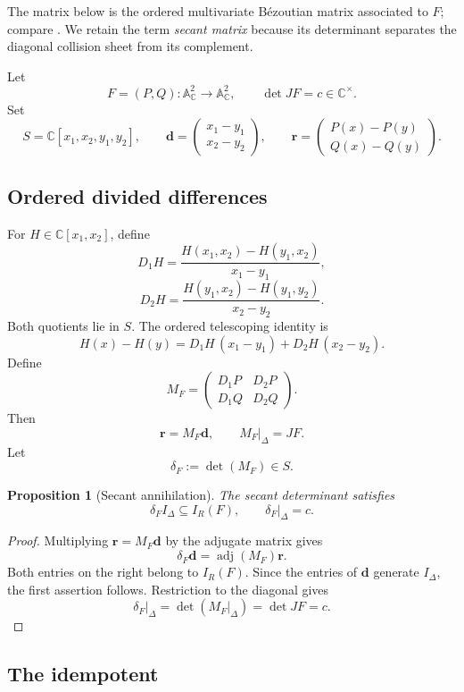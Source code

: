 \documentclass[11pt]{article}
\newtheorem{proposition}[theorem]{Proposition}
\newcommand{\A}{\mathbb A}
\newcommand{\C}{\mathbb C}
\begin{document}
The matrix below is the ordered multivariate B\'ezoutian matrix associated
to \(F\); compare \cite{McKean2023Bezoutians,SchejaStorch1975}.  We retain
the term \emph{secant matrix} because its determinant separates the
diagonal collision sheet from its complement.

Let
\[
  F=(P,Q)\colon\A^2_{\C}\longrightarrow\A^2_{\C},
  \qquad
  \det JF=c\in\C^\times.
\]
Set
\[
  S=\C[x_1,x_2,y_1,y_2],\qquad
  \mathbf d=
  \begin{pmatrix}x_1-y_1\\x_2-y_2\end{pmatrix},\qquad
  \mathbf r=
  \begin{pmatrix}P(x)-P(y)\\Q(x)-Q(y)\end{pmatrix}.
\]

\subsection{Ordered divided differences}

For \(H\in\C[x_1,x_2]\), define
\[
  D_1H
  =
  \frac{H(x_1,x_2)-H(y_1,x_2)}{x_1-y_1},
\]
\[
  D_2H
  =
  \frac{H(y_1,x_2)-H(y_1,y_2)}{x_2-y_2}.
\]
Both quotients lie in \(S\).  The ordered telescoping identity is
\[
  H(x)-H(y)
  =D_1H\,(x_1-y_1)+D_2H\,(x_2-y_2).
\]
Define
\[
  M_F=
  \begin{pmatrix}
    D_1P&D_2P\\
    D_1Q&D_2Q
  \end{pmatrix}.
\]
Then
\[
  \mathbf r=M_F\mathbf d,\qquad
  M_F\big|_\Delta=JF.
\]
Let
\[
  \delta_F:=\det(M_F)\in S.
\]

\begin{proposition}[Secant annihilation]
\label{prop:secant-annihilation}
The secant determinant satisfies
\[
  \delta_FI_\Delta\subseteq I_R(F),
  \qquad
  \delta_F\big|_\Delta=c.
\]
\end{proposition}

\begin{proof}
Multiplying \(\mathbf r=M_F\mathbf d\) by the adjugate matrix gives
\[
  \delta_F\mathbf d=\operatorname{adj}(M_F)\mathbf r.
\]
Both entries on the right belong to \(I_R(F)\).  Since the entries of
\(\mathbf d\) generate \(I_\Delta\), the first assertion follows.
Restriction to the diagonal gives
\[
  \delta_F\big|_\Delta
  =\det(M_F|_\Delta)
  =\det JF
  =c.
\]
\end{proof}

\subsection{The idempotent}
\end{document}
